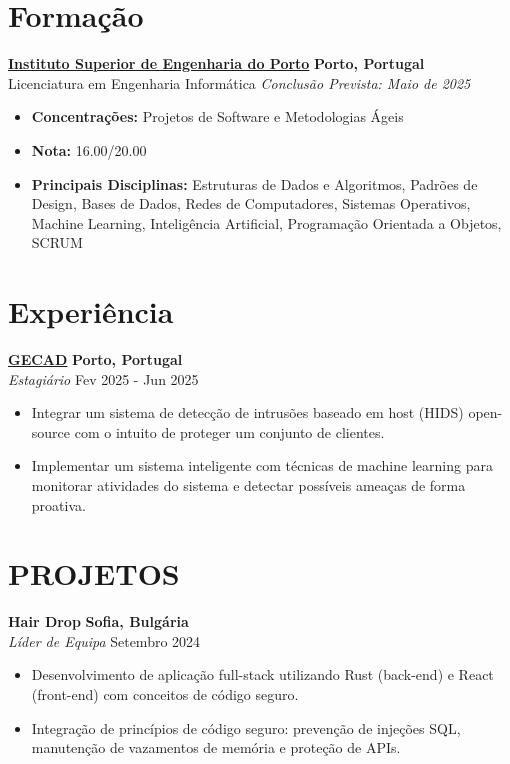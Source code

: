\documentclass[10pt, letterpaper]{article}
\newenvironment{highlights}{
    \begin{itemize}[
        topsep=0.10 cm,
        parsep=0.10 cm,
        partopsep=0pt,
        itemsep=0pt,
        leftmargin=1cm %
    ]
}{
    \end{itemize}
}
\newenvironment{subhighlights}{
    \begin{itemize}[
        topsep=0.10 cm,
        parsep=0.10 cm,
        partopsep=0pt,
        itemsep=0pt,
        leftmargin=1.5cm, %
        label=$\vcenter{\hbox{\scriptsize$\circ$}}$ %
    ]
}{
    \end{itemize}
}
\begin{document}
\section{Formação}
\textbf{\href{https://www.isep.ipp.pt}{Instituto Superior de Engenharia do Porto}} \hfill \textbf{Porto, Portugal} \\
Licenciatura em Engenharia Informática \hfill \textit{Conclusão Prevista: Maio de 2025} \\
\begin{subhighlights}
    \item \textbf{Concentrações:} Projetos de Software e Metodologias Ágeis
    \item \textbf{Nota:} 16.00/20.00
    \item \textbf{Principais Disciplinas:} Estruturas de Dados e Algoritmos, Padrões de Design, Bases de Dados, 
    Redes de Computadores, Sistemas Operativos, Machine Learning, Inteligência Artificial, Programação Orientada a Objetos, SCRUM
\end{subhighlights}

\section{Experiência}
\textbf{\href{https://www.gecad.isep.ipp.pt/}{GECAD}} \hfill \textbf{Porto, Portugal} \\
\textit{Estagiário} \hfill Fev 2025 - Jun 2025 \\
\begin{highlights}
\item Integrar um sistema de detecção de intrusões baseado em host (HIDS) open-source com o intuito de proteger um conjunto de clientes.

\item Implementar um sistema inteligente com técnicas de machine learning para monitorar atividades do sistema e detectar possíveis ameaças de forma proativa.
\end{highlights}
\section{PROJETOS}
\textbf{Hair Drop} \hfill \textbf{Sofia, Bulgária} \\
\textit{Líder de Equipa} \hfill Setembro 2024 \\
\begin{highlights}
    \item Desenvolvimento de aplicação full-stack utilizando Rust (back-end) e React (front-end) com conceitos de código seguro.
    \item Integração de princípios de código seguro: prevenção de injeções SQL, manutenção de vazamentos de memória e proteção de APIs.
\end{highlights}
\end{document}
